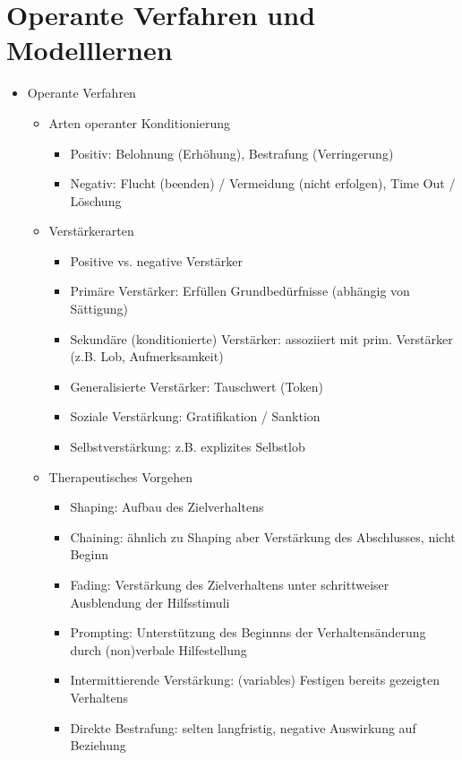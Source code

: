 \documentclass[11pt, paper=a4, twocolumn]{scrartcl}
\begin{document}
	\section{Operante Verfahren und Modelllernen}
		\begin{itemize}
			\item Operante Verfahren
				\begin{itemize}
					\item Arten operanter Konditionierung
						\begin{itemize}
							\item Positiv: Belohnung (Erhöhung), Bestrafung (Verringerung)
							\item Negativ: Flucht (beenden) / Vermeidung (nicht erfolgen), Time Out / Löschung
						\end{itemize}
					\item Verstärkerarten
						\begin{itemize}
							\item Positive vs. negative Verstärker
							\item Primäre Verstärker: Erfüllen Grundbedürfnisse (abhängig von Sättigung)
							\item Sekundäre (konditionierte) Verstärker: assoziiert mit prim. Verstärker (z.B. Lob, 
								Aufmerksamkeit)
							\item Generalisierte Verstärker: Tauschwert (Token)
							\item Soziale Verstärkung: Gratifikation / Sanktion
							\item Selbstverstärkung: z.B. explizites Selbstlob
						\end{itemize}
					\item Therapeutisches Vorgehen
						\begin{itemize}
							\item Shaping: Aufbau des Zielverhaltens
							\item Chaining: ähnlich zu Shaping aber Verstärkung des Abschlusses, nicht Beginn
							\item Fading: Verstärkung des Zielverhaltens unter schrittweiser Ausblendung der Hilfsstimuli
							\item Prompting: Unterstützung des Beginnns der Verhaltensänderung durch (non)verbale 
								Hilfestellung
							\item Intermittierende Verstärkung: (variables) Festigen bereits gezeigten Verhaltens
							\item Direkte Bestrafung: selten langfristig, negative Auswirkung auf Beziehung

\end{itemize}
\end{itemize}
\end{itemize}
\end{document}
